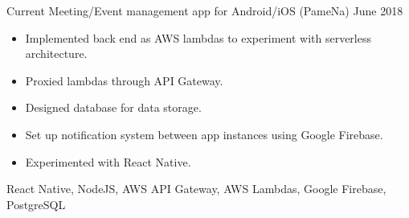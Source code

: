 %
%
%

  \begin{experiences}
    \personal
      {Current}
      {Meeting/Event management app for Android/iOS (PameNa)}
      {June 2018}
      {
        \begin{itemize}
          \item Implemented back end as AWS lambdas to experiment with serverless architecture.
          \item Proxied lambdas through API Gateway.
          \item Designed database for data storage.
          \item Set up notification system between app instances using Google Firebase.
          \item Experimented with React Native.
        \end{itemize}
      }
      {React Native, NodeJS, AWS API Gateway, AWS Lambdas, Google Firebase, PostgreSQL}
      {}
  \end{experiences}
